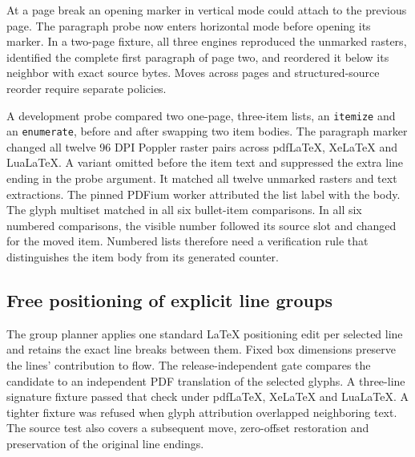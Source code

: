 At a page break an opening marker in vertical mode could attach to the
previous page. The paragraph probe now enters horizontal mode before opening
its marker. In a two-page fixture, all three engines reproduced the unmarked
rasters, identified the complete first paragraph of page two, and reordered
it below its neighbor with exact source bytes. Moves across pages and
structured-source reorder require separate policies.

A development probe compared two one-page, three-item lists, an
\texttt{itemize} and an \texttt{enumerate}, before and after swapping two
item bodies. The paragraph marker changed all twelve 96 DPI Poppler
raster pairs across pdfLaTeX, XeLaTeX and LuaLaTeX. A variant omitted
\texttt{\string\leavevmode} before the item text and suppressed the
extra line ending in the probe argument. It matched all twelve unmarked
rasters and text extractions. The pinned PDFium worker attributed the
list label with the body. The glyph multiset matched in all six
bullet-item comparisons. In all six numbered comparisons, the visible
number followed its source slot and changed for the moved item.
Numbered lists therefore need a verification rule that distinguishes
the item body from its generated counter.

\subsection{Free positioning of explicit line groups}
The group planner applies one standard LaTeX positioning edit per selected
line and retains the exact line breaks between them. Fixed box dimensions
preserve the lines' contribution to flow. The release-independent gate
compares the candidate to an independent PDF translation of the selected
glyphs. A three-line signature fixture passed that check under pdfLaTeX,
XeLaTeX and LuaLaTeX. A tighter fixture was refused when glyph attribution
overlapped neighboring text. The source test also covers a subsequent move,
zero-offset restoration and preservation of the original line endings.
